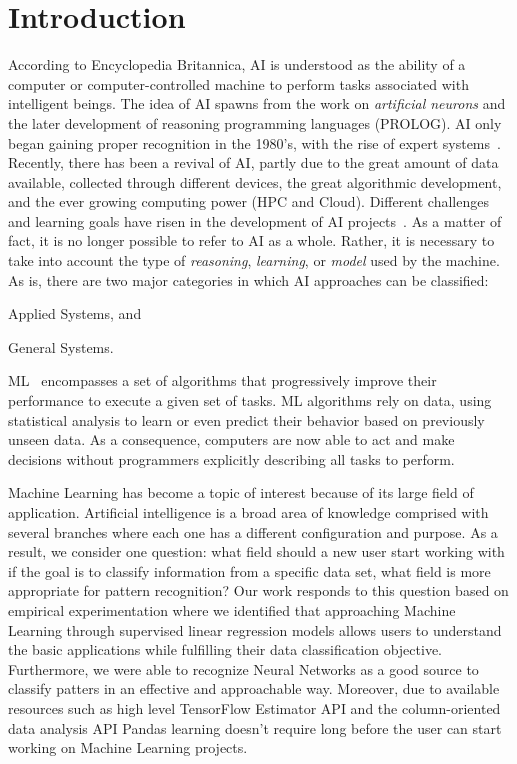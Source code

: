 
\section{Introduction}
\label{sec:introduction}

According to Encyclopedia Britannica, \ac{AI} is understood as the ability of a computer or 
computer-controlled machine to perform tasks associated with intelligent beings. The idea of 
\ac{AI} spawns from the work on \textit{artificial neurons} and the later development of reasoning 
programming languages (\eg PROLOG). \ac{AI} only began gaining proper recognition in the 
1980's, with the rise of expert systems~\cite{russel09}.  Recently, there has been a revival of 
\ac{AI}, partly due to the great amount of data available, collected through different devices, the 
great algorithmic development, and the ever growing computing power (\ie \ac{HPC} and Cloud). 
Different challenges and learning goals have risen in the development of \ac{AI} 
projects~\cite{russel09}. As a matter of fact, it is no longer possible to refer to \ac{AI} as a whole. 
Rather, it is necessary to take into account the type of \emph{reasoning}, \emph{learning}, or 
\emph{model} used by the machine. As is, there are two major categories in which \ac{AI} 
approaches can be classified:
\begin{enumerate*}[label=(\arabic*)]
\item Applied Systems, and
\item General Systems.
\end{enumerate*}

\ac{ML}~\cite{mitchell97} encompasses a set of algorithms that progressively improve their 
performance to execute a given set of tasks. \ac{ML} algorithms rely on data, using statistical 
analysis to learn or even predict their behavior based on previously unseen data. As a consequence, 
computers are now able to act and make decisions without programmers explicitly describing all 
tasks to perform.

Machine Learning has become a topic of interest because of its large field of application. Artificial intelligence is a broad area of knowledge comprised with several branches where each one has a different configuration and purpose. As a result, we consider one question: what field should a new user start working with if the goal is to classify information from a specific data set, what field is more appropriate for pattern recognition? Our work responds to this question based on empirical experimentation where we identified that approaching Machine Learning through supervised linear regression models allows users to understand the basic applications while fulfilling their data classification objective. Furthermore, we were able to recognize Neural Networks as a good source to classify patters in an effective and approachable way. Moreover, due to available resources such as high level TensorFlow Estimator API and the column-oriented data analysis API Pandas learning doesn’t require long before the user can start working on Machine Learning projects. 

